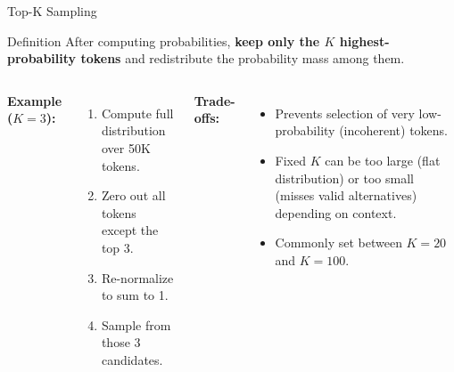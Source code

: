 \documentclass{beamer}
\begin{document}
\begin{frame}{Top-K Sampling}
    \begin{block}{Definition}
        After computing probabilities, \textbf{keep only the $K$ highest-probability tokens}
        and redistribute the probability mass among them.
    \end{block}

    \vspace{0.2cm}
    \begin{columns}
        \textbf{Example ($K = 3$):}
        \begin{enumerate}
            \item Compute full distribution over 50K tokens.
            \item Zero out all tokens except the top 3.
            \item Re-normalize to sum to 1.
            \item Sample from those 3 candidates.
        \end{enumerate}

        \textbf{Trade-offs:}
        \begin{itemize}
            \item Prevents selection of very low-probability (incoherent) tokens.
            \item Fixed $K$ can be too large (flat distribution) or too small (misses valid alternatives) depending on context.
            \item Commonly set between $K = 20$ and $K = 100$.
        \end{itemize}
    \end{columns}
\end{frame}
\end{document}
